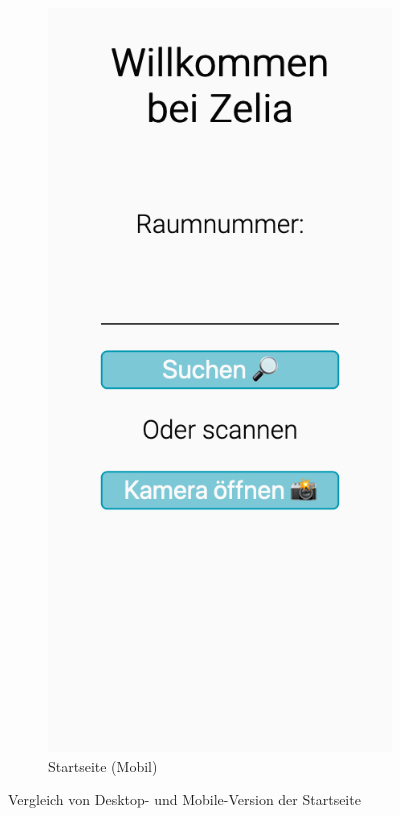 \begin{figure}[H]
\begin{subfigure}[c]{0.35\textwidth}
        \includegraphics[width=\textwidth]{media/ResponsiveDesign/ZeliaHomeMobile.png}
        \caption{Startseite (Mobil)}
        \label{fig:homeMobile}
    \end{subfigure}
    \caption{Vergleich von Desktop- und Mobile-Version der Startseite}
    \label{fig:home}
\end{figure}